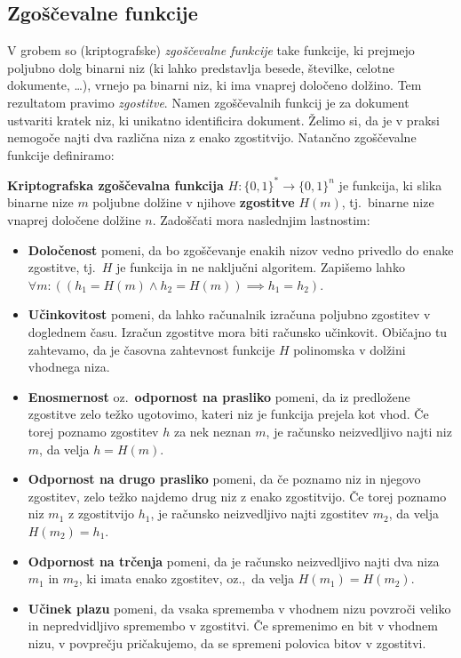 \documentclass[isrm2, tisk]{fmfdelo}
\begin{document}
\subsection{Zgoščevalne funkcije}
V grobem so (kriptografske) \textit{zgoščevalne funkcije} take funkcije, ki prejmejo poljubno dolg binarni
niz (ki lahko predstavlja besede, številke, celotne dokumente, \dots), vrnejo pa binarni niz, ki ima
vnaprej določeno dolžino. Tem rezultatom pravimo \textit{zgostitve}. Namen zgoščevalnih funkcij je
za dokument ustvariti kratek niz, ki unikatno identificira dokument. Želimo si, da je v praksi
nemogoče najti dva različna niza z enako zgostitvijo. Natančno zgoščevalne funkcije definiramo:

\begin{definicija}
\label{def:hash}
    \textbf{Kriptografska zgoščevalna funkcija} $H: \{0, 1\}^* \rightarrow \{0, 1\}^n$ je funkcija, 
    ki slika binarne nize $m$ poljubne dolžine v njihove \textbf{zgostitve} $H(m)$, tj.\ binarne nize 
    vnaprej določene dolžine $n$. Zadoščati mora naslednjim lastnostim:
    \begin{itemize}
        \item \textbf{Določenost} pomeni, da bo zgoščevanje enakih nizov vedno privedlo do enake 
            zgostitve, tj.\ $H$ je funkcija in ne naključni algoritem. Zapišemo lahko
            $\forall m: ((h_1 = H(m) \wedge h_2 = H(m)) \implies h_1 = h_2)$.
        \item \textbf{Učinkovitost} pomeni, da lahko računalnik izračuna poljubno zgostitev v doglednem 
            času. Izračun zgostitve mora biti računsko učinkovit. Običajno tu zahtevamo, da je časovna
            zahtevnost funkcije $H$ polinomska v dolžini vhodnega niza.
        \item \textbf{Enosmernost} oz.\ \textbf{odpornost na prasliko} pomeni, da iz predložene 
            zgostitve zelo težko ugotovimo, kateri niz je funkcija prejela kot vhod. Če torej poznamo 
            zgostitev $h$ za nek neznan $m$, je računsko neizvedljivo najti niz $m$, da velja $h = H(m)$.
        \item \textbf{Odpornost na drugo prasliko} pomeni, da če poznamo niz in njegovo zgostitev, 
            zelo težko najdemo drug niz z enako zgostitvijo. Če torej poznamo niz $m_1$ z zgostitvijo
            $h_1$, je računsko neizvedljivo najti zgostitev $m_2$, da velja $H(m_2) = h_1$.
        \item \textbf{Odpornost na trčenja} pomeni, da je računsko neizvedljivo najti dva niza $m_1$
            in $m_2$, ki imata enako zgostitev, oz.,\ da velja $H(m_1) = H(m_2)$.
        \item \textbf{Učinek plazu} pomeni, da vsaka sprememba v vhodnem nizu povzroči veliko in
            nepredvidljivo spremembo v zgostitvi. Če spremenimo en bit v vhodnem nizu, v povprečju
            pričakujemo, da se spremeni polovica bitov v zgostitvi.
    \end{itemize}
\end{definicija}
\end{document}
